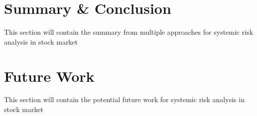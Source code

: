 \documentclass[a4paper,11pt]{article}
\begin{document}
\section{Summary \& Conclusion}
This section will contain the summary from multiple approaches for systemic risk analysis in stock market

\section{Future Work}
This section will contain the potential future work for systemic risk analysis in stock market



\small
\end{document}
